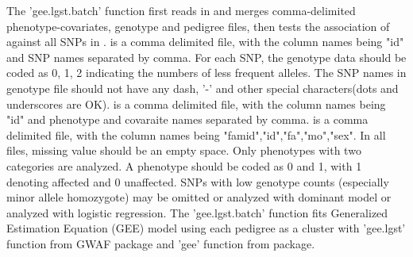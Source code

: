\begin{Details}\relax
The 'gee.lgst.batch' 
function first reads in and merges comma-delimited phenotype-covariates, genotype 
and pedigree files, then tests the association of  against all SNPs in .
 is a comma delimited file, with the column names being "id" and SNP names separated by comma.
For each SNP, the genotype data should be coded as 0, 1, 2 indicating the numbers of less frequent 
alleles. The SNP names in genotype file should not have any 
dash, '-' and other special characters(dots and underscores are OK).  is a comma delimited file, with the column names being "id" and phenotype and 
covaraite names separated by comma.  is a comma delimited file, with the column names being 
"famid","id","fa","mo","sex". In all files, missing value should be an empty space.
Only phenotypes with two categories are analyzed. A phenotype should be coded as 
0 and 1, with 1 denoting affected and 0 unaffected. SNPs with low genotype counts 
(especially minor allele homozygote) may be omitted or analyzed with dominant model or
analyzed with logistic regression. 
The 'gee.lgst.batch' function fits Generalized Estimation Equation (GEE) model using each pedigree as a cluster 
with 'gee.lgst' function from GWAF package and 'gee' function from  package.
\end{Details}

